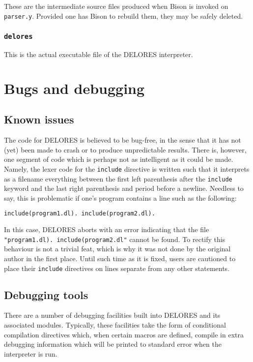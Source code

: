 \documentclass[a4paper,10pt,twocolumn]{article}
\begin{document}
These are the intermediate source files produced when Bison is invoked
on \texttt{parser.y}. Provided one has Bison to rebuild them, they may
be safely deleted.
  
\subsubsection{\texttt{delores}}
  
This is the actual executable file of the DELORES interpreter.

\section{Bugs and debugging}

\subsection{Known issues}

The code for DELORES is believed to be bug-free, in the sense that it
has not (yet) been made to crash or to produce unpredictable results.
There is, however, one segment of code which is perhaps not as
intelligent as it could be made. Namely, the lexer code for the
\texttt{include} directive is written such that it interprets as a
filename everything between the first left parenthesis after the
\texttt{include} keyword and the last right parenthesis and period
before a newline.  Needless to say, this is problematic if one's
program contains a line such as the following:
\begin{verbatim}
include(program1.dl). include(program2.dl).
\end{verbatim}
In this case, DELORES aborts with an error indicating that the file
\texttt{"program1.dl). include(program2.dl"} cannot be found. To
rectify this behaviour is not a trivial feat, which is why it was not
done by the original author in the first place. Until such time as it
is fixed, users are cautioned to place their \texttt{include}
directives on lines separate from any other statements.

\subsection{Debugging tools}

There are a number of debugging facilities built into DELORES and its
associated modules. Typically, these facilities take the form of
conditional compilation directives which, when certain macros are
defined, compile in extra debugging information which will be printed
to standard error when the interpreter is run.
\end{document}
